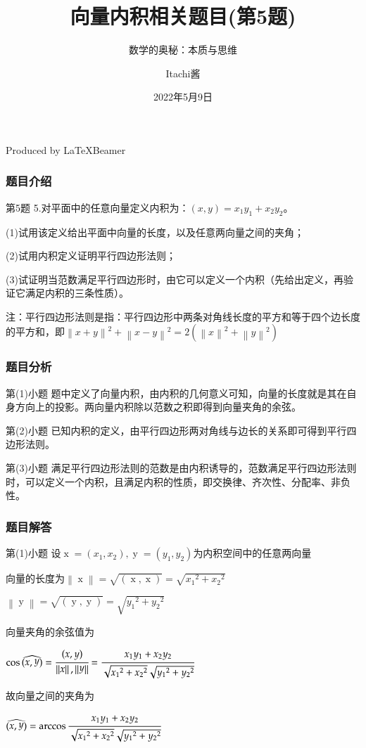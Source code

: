 \documentclass{beamer}
\title{向量内积相关题目(第5题)}
\subtitle{数学的奥秘：本质与思维}
\author{Itachi酱}
\date{2022年5月9日}
\begin{document}
\begin{frame}
\titlepage
Produced by \LaTeX\hspace{0.4em}Beamer
\end{frame}


\begin{frame}
\frametitle{题目介绍}
\begin{block}{第5题}
5.对平面中的任意向量定义内积为：$(x,y)=x_{1}y_{1}+x_{2}y_{2}$。

(1)试用该定义给出平面中向量的长度，以及任意两向量之间的夹角；

(2)试用内积定义证明平行四边形法则；

(3)试证明当范数满足平行四边形时，由它可以定义一个内积（先给出定义，再验证它满足内积的三条性质）。

注：平行四边形法则是指：平行四边形中两条对角线长度的平方和等于四个边长度的平方和，即$\left\|x+y\right\|^{2}+\left\|x-y\right\|^{2}=2(\left\|x\right\|^{2}+\left\|y\right\|^{2})$
\end{block}
\end{frame}

\begin{frame}[t]
\frametitle{题目分析}
\begin{block}{第(1)小题}
题中定义了向量内积，由内积的几何意义可知，向量的长度就是其在自身方向上的投影。两向量内积除以范数之积即得到向量夹角的余弦。
\end{block}
\begin{block}{第(2)小题}
已知内积的定义，由平行四边形两对角线与边长的关系即可得到平行四边形法则。
\end{block}
\begin{block}{第(3)小题}
满足平行四边形法则的范数是由内积诱导的，范数满足平行四边形法则时，可以定义一个内积，且满足内积的性质，即交换律、齐次性、分配率、非负性。
\end{block}
\end{frame}

\begin{frame}[t]
\frametitle{题目解答}
\begin{block}{第(1)小题}
设$\mathop{x}=(x_{1},x_{2}),\mathop{y}=(y_{1},y_{2})$为内积空间中的任意两向量

向量的长度为$\left\|\mathop{x}\right\|=\sqrt{(\mathop{x},\mathop{x})}=\sqrt{{x_{1}}^{2}+{{x}_{2}}^{2}}$

\hspace{6.3em}$\left\|\mathop{y}\right\|=\sqrt{(\mathop{y},\mathop{y})}=\sqrt{{y_{1}}^{2}+{{y}_{2}}^{2}}$

向量夹角的余弦值为

$\cos\widehat{(\mathop{x},\mathop{y})}=\cfrac{(x,y)}{\left\|\mathop{x}\right\|,\left\|\mathop{y}\right\|}=\cfrac{x_{1}y_{1}+x_{2}y_{2}}{\sqrt{{x_{1}}^{2}+{{x}_{2}}^{2}}\sqrt{{y_{1}}^{2}+{{y}_{2}}^{2}}}$

故向量之间的夹角为

$\widehat{(\mathop{x},\mathop{y})}=\arccos\cfrac{x_{1}y_{1}+x_{2}y_{2}}{\sqrt{{x_{1}}^{2}+{{x}_{2}}^{2}}\sqrt{{y_{1}}^{2}+{{y}_{2}}^{2}}}$
\end{block}
\end{frame}
\end{document}
